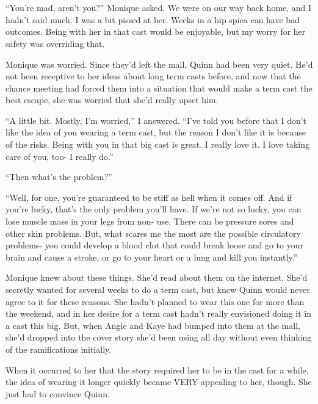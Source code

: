 \chapter{~}
``You're mad, aren't you?'' Monique asked. We were on our way back home, and I hadn't said
much. I was a bit pissed at her. Weeks in a hip spica can have bad outcomes. Being with her in
that cast would be enjoyable, but my worry for her safety was overriding that.

\begin{thought}
Monique was worried. Since they'd left the mall, Quinn had been very quiet. He'd not been
receptive to her ideas about long term casts before, and now that the chance meeting had forced
them into a situation that would make a term cast the best escape, she was worried that she'd
really upset him.
\end{thought}

``A little bit. Mostly, I'm worried,'' I answered. ``I've told you before that I don't like
the idea of you wearing a term cast, but the reason I don't like it is because of the risks.
Being with you in that big cast is great. I really love it. I love taking care of you, too- I
really do.''

``Then what's the problem?''

``Well, for one, you're guaranteed to be stiff as hell when it comes off. And if you're
lucky, that's the only problem you'll have. If we're not so lucky, you can lose muscle mass in
your legs from non- use. There can be pressure sores and other skin problems. But, what scares
me the most are the possible circulatory problems- you could develop a blood clot that could
break loose and go to your brain and cause a stroke, or go to your heart or a lung and kill you
instantly.''

\begin{thought}
Monique knew about these things. She'd read about them on the internet. She'd secretly
wanted for several weeks to do a term cast, but knew Quinn would never agree to it for these
reasons. She hadn't planned to wear this one for more than the weekend, and in her desire for a
term cast hadn't really envisioned doing it in a cast this big. But, when Angie and Kaye had
bumped into them at the mall, she'd dropped into the cover story she'd been using all day
without even thinking of the ramifications initially.

When it occurred to her that the story required her to be in the cast for a while, the idea
of wearing it longer quickly became VERY appealing to her, though. She just had to convince
Quinn.
\end{thought}


